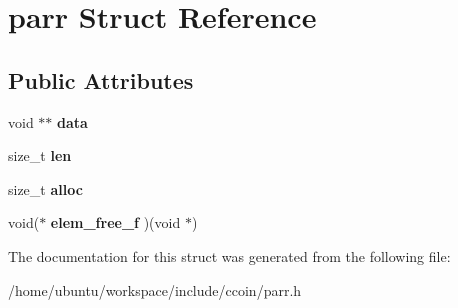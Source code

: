 \hypertarget{structparr}{\section{parr Struct Reference}
\label{structparr}
}
\subsection*{Public Attributes}
\begin{DoxyCompactItemize}
\item 
\hypertarget{structparr_ac2748012d9ba7df09a7ef5f03d3b4adc}{void $\ast$$\ast$ {\bfseries data}}\label{structparr_ac2748012d9ba7df09a7ef5f03d3b4adc}

\item 
\hypertarget{structparr_af645d03435eec05c1d20d4fe96409dd0}{size\-\_\-t {\bfseries len}}\label{structparr_af645d03435eec05c1d20d4fe96409dd0}

\item 
\hypertarget{structparr_a2bf4df17c7ab43c209af6dfa093096c0}{size\-\_\-t {\bfseries alloc}}\label{structparr_a2bf4df17c7ab43c209af6dfa093096c0}

\item 
\hypertarget{structparr_aaf9af52d3c08f00dfda37c53e4a7e5c9}{void($\ast$ {\bfseries elem\-\_\-free\-\_\-f} )(void $\ast$)}\label{structparr_aaf9af52d3c08f00dfda37c53e4a7e5c9}

\end{DoxyCompactItemize}


The documentation for this struct was generated from the following file\-:\begin{DoxyCompactItemize}
\item 
/home/ubuntu/workspace/include/ccoin/parr.\-h\end{DoxyCompactItemize}
